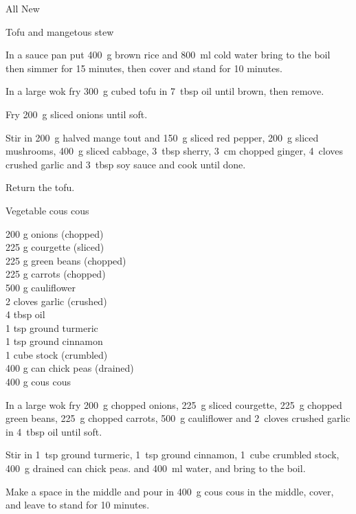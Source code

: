\begin{menu}{All New}
\begin{recipe}{2}{Tofu and mangetous stew}
    \begin{instructions}
    \item 
      In a
      sauce pan
      put
      400~g  brown rice
      and
      800~ml  cold water
      bring to the boil then simmer for 15 minutes,
      then cover and stand for 10 minutes.
    \item 
        In a large wok fry
        300~g cubed tofu
        in
        7~tbsp  oil
        until brown, then remove.
      \item 
        Fry 200~g sliced onions until soft.
      \item 
        Stir in
        200~g halved mange tout
        and
        150~g sliced red pepper,
        200~g sliced mushrooms,
        400~g sliced cabbage,
        3~tbsp  sherry,
        3~cm chopped ginger,
        4~cloves crushed garlic
        and
        3~tbsp  soy sauce
        and cook until done.
      \item 
        Return the tofu.
      
    \end{instructions}
    \end{recipe}%
  
    \begin{recipe}{2}{Vegetable cous cous}%
    
		\begin{ingredients}
		200 g onions (chopped) \\
	225 g courgette (sliced) \\
	225 g green beans (chopped) \\
	225 g carrots (chopped) \\
	500 g cauliflower  \\
	2 cloves garlic (crushed) \\
	4 tbsp oil  \\
	1 tsp ground turmeric  \\
	1 tsp ground cinnamon  \\
	1 cube stock (crumbled) \\
	400 g can chick peas (drained) \\
	400 g cous cous  \\
	
		\end{ingredients}
	
    \begin{instructions}
    \item 
        In a large wok fry
        200~g chopped onions,
        225~g sliced courgette,
        225~g chopped green beans,
        225~g chopped carrots,
        500~g  cauliflower
        and
        2~cloves crushed garlic
        in
        4~tbsp  oil
        until soft.
      \item 
        Stir in
        1~tsp  ground turmeric,
        1~tsp  ground cinnamon,
        1~cube crumbled stock,
        400~g drained can chick peas.
        and
        400~ml  water,
        and bring to the boil.
      \item 
        Make a space in the middle and pour in
        400~g  cous cous
        in the middle, cover,
        and leave to stand for 10 minutes.
      

\end{instructions}
\end{recipe}
\end{menu}
